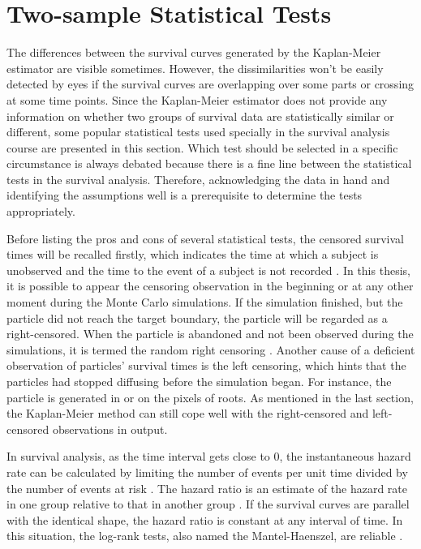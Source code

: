 \section{Two-sample Statistical Tests}\label{statistical tests}

The differences between the survival curves generated by the
Kaplan-Meier estimator are visible sometimes. However, the
dissimilarities won't be easily detected by eyes if the survival
curves are overlapping over some parts or crossing at some time
points.  Since the Kaplan-Meier estimator does not provide any
information on whether two groups of survival data are statistically
similar or different, some popular statistical tests used specially in
the survival analysis course are presented in this section. Which test
should be selected in a specific circumstance is always debated
because there is a fine line between the statistical tests in the
survival analysis. Therefore, acknowledging the data in hand and
identifying the assumptions well is a prerequisite to determine the
tests appropriately.

Before listing the pros and cons of several statistical tests, the
censored survival times will be recalled firstly, which indicates the
time at which a subject is unobserved and the time to the event of a
subject is not recorded \cite{etikan2018choosing}. In this thesis, it
is possible to appear the censoring observation in the beginning or at
any other moment during the Monte Carlo simulations. If the simulation
finished, but the particle did not reach the target boundary, the
particle will be regarded as a right-censored. When the particle is
abandoned and not been observed during the simulations, it is termed
the random right censoring \cite{etikan2018choosing}. Another cause of
a deficient observation of particles' survival times is the left
censoring, which hints that the particles had stopped diffusing before
the simulation began. For instance, the particle is generated in or on
the pixels of roots. As mentioned in the last section, the
Kaplan-Meier method can still cope well with the right-censored and
left-censored observations in output.


In survival analysis, as the time interval gets close to $0$, the
instantaneous hazard rate can be calculated by limiting the number of
events per unit time divided by the number of events at risk
\cite{case2002interpreting}. The hazard ratio is an estimate of the
hazard rate in one group relative to that in another group
\cite{singh2011survival}. If the survival curves are parallel with the
identical shape, the hazard ratio is constant at any interval of
time. In this situation, the log-rank tests, also named the
Mantel-Haenszel, are reliable \cite{custodio2007diagnostics}.

